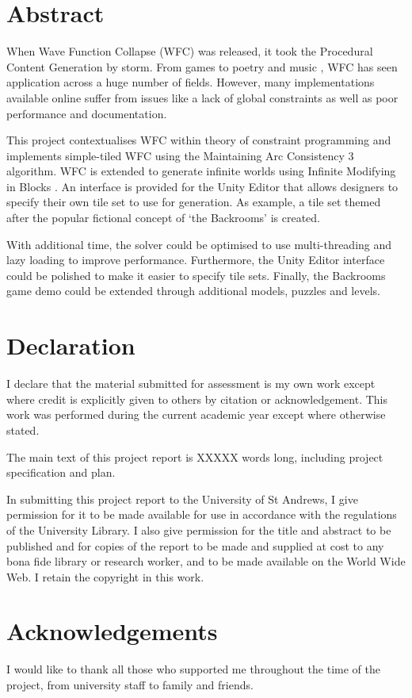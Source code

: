 \section*{Abstract}
When Wave Function Collapse (WFC) was released, it took the Procedural Content Generation by storm. From games \cite{townscaper,badnorth,cavesofqud} to poetry \cite{WFC_poetry} and music \cite{WFC_music,WFC_music_2}, WFC has seen application across a huge number of fields. However, many implementations available online suffer from issues like a lack of global constraints as well as poor performance and documentation.

This project contextualises WFC within theory of constraint programming and implements simple-tiled WFC using the Maintaining Arc Consistency 3 algorithm. WFC is extended to generate infinite worlds using Infinite Modifying in Blocks \cite{Infinite_Modifying_In_Blocks}. An interface is provided for the Unity Editor that allows designers to specify their own tile set to use for generation. As example, a tile set themed after the popular fictional concept of `the Backrooms' is created.

With additional time, the solver could be optimised to use multi-threading and lazy loading to improve performance. Furthermore, the Unity Editor interface could be polished to make it easier to specify tile sets. Finally, the Backrooms game demo could be extended through additional models, puzzles and levels.

\section*{Declaration}
I declare that the material submitted for assessment is my own work except where credit is explicitly given to others by citation or acknowledgement. This work was performed during the current academic year except where otherwise stated.
\par \vspace{\baselineskip}
The main text of this project report is XXXXX words
long, including project specification and plan.
\par \vspace{\baselineskip}
In submitting this project report to the University of St
Andrews, I give permission for it to be made available
for use in accordance with the regulations of the University
Library. I also give permission for the title and abstract
to be published and for copies of the report to be made and
supplied at cost to any bona fide library or research worker,
and to be made available on the World Wide Web. I retain the copyright in this work.

\section*{Acknowledgements}
I would like to thank all those who supported me throughout the time of the project, from university staff to family and friends.